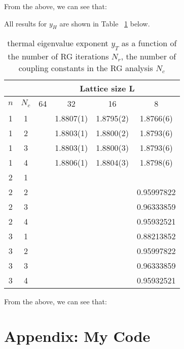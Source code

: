 \documentclass{article}
\begin{document}
From the above, we can see that: 


All results for $y_H$ are shown in Table ~\ref{yH} below.

\begin{table}[H]
\centering
\begin{tabular}{|c|c|c|c|c|c|} 
\hline
 \multicolumn{2}{|c|}{ }& \multicolumn{4}{c|}{Lattice size L}\\
 \hline
 $n$ & $N_c$ & 64 & 32 & 16 & 8 \\
 \hline
 1 & 1 & & 1.8807(1) & 1.8795(2) & 1.8766(6) \\
 1 & 2 & & 1.8803(1) & 1.8800(2) & 1.8793(6)\\
 1 & 3 & & 1.8803(1) & 1.8800(3) & 1.8793(6)\\
 1 & 4 & & 1.8806(1) & 1.8804(3) & 1.8798(6)\\
 \hline
 2 & 1 & & & & \\
 2 & 2 & & & & 0.95997822\\
 2 & 3 & & & & 0.96333859\\
 2 & 4 & & & & 0.95932521\\
 \hline
 3 & 1 & & & & 0.88213852\\
 3 & 2 & & & & 0.95997822\\
 3 & 3 & & & & 0.96333859\\
 3 & 4 & & & & 0.95932521\\
 \hline
 \end{tabular}
 \caption{\label{yH}thermal eigenvalue
exponent $y_T$ as a function of the number of RG iterations $N_r$, the number of coupling
constants in the RG analysis $N_c$}
\end{table}

From the above, we can see that: 




\appendix

\section*{Appendix: My Code}


\iffalse

\inputminted[]{python}{"MCRG with Cluster MC - Working Version.py"}
\fi
\end{document}
